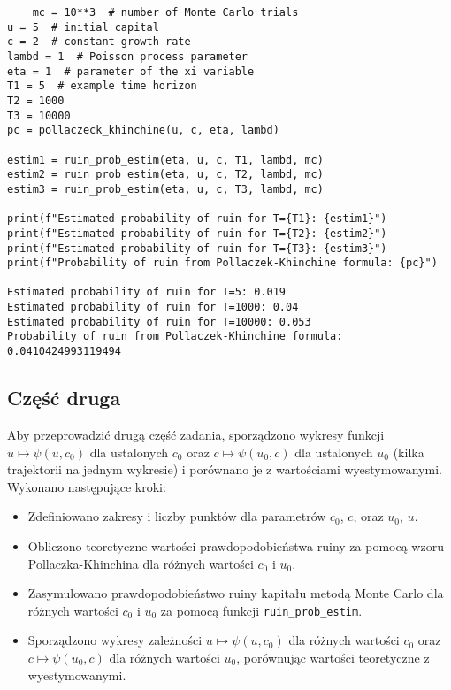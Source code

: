 \documentclass[12pt,letterpaper]{article}
\theoremstyle{definition}
\begin{document}
\begin{lstlisting}
    mc = 10**3  # number of Monte Carlo trials
u = 5  # initial capital
c = 2  # constant growth rate
lambd = 1  # Poisson process parameter
eta = 1  # parameter of the xi variable
T1 = 5  # example time horizon
T2 = 1000
T3 = 10000
pc = pollaczeck_khinchine(u, c, eta, lambd)

estim1 = ruin_prob_estim(eta, u, c, T1, lambd, mc)
estim2 = ruin_prob_estim(eta, u, c, T2, lambd, mc)
estim3 = ruin_prob_estim(eta, u, c, T3, lambd, mc)

print(f"Estimated probability of ruin for T={T1}: {estim1}")
print(f"Estimated probability of ruin for T={T2}: {estim2}")
print(f"Estimated probability of ruin for T={T3}: {estim3}")
print(f"Probability of ruin from Pollaczek-Khinchine formula: {pc}")

Estimated probability of ruin for T=5: 0.019
Estimated probability of ruin for T=1000: 0.04
Estimated probability of ruin for T=10000: 0.053
Probability of ruin from Pollaczek-Khinchine formula: 0.0410424993119494

\end{lstlisting}

\subsection{Część druga}
Aby przeprowadzić drugą część zadania, sporządzono wykresy funkcji \( u \mapsto \psi(u, c_0) \) dla ustalonych \( c_0 \) oraz \( c \mapsto \psi(u_0, c) \) dla ustalonych \( u_0 \) (kilka trajektorii na jednym wykresie) i porównano je z wartościami wyestymowanymi. Wykonano następujące kroki:
\begin{itemize}
    \item Zdefiniowano zakresy i liczby punktów dla parametrów \( c_0 \), \( c \), oraz \( u_0 \), \( u \).
    \item Obliczono teoretyczne wartości prawdopodobieństwa ruiny za pomocą wzoru Pollaczka-Khinchina dla różnych wartości \( c_0 \) i \( u_0 \).
    \item Zasymulowano prawdopodobieństwo ruiny kapitału metodą Monte Carlo dla różnych wartości \( c_0 \) i \( u_0 \) za pomocą funkcji \texttt{ruin\_prob\_estim}.
    \item Sporządzono wykresy zależności \( u \mapsto \psi(u, c_0) \) dla różnych wartości \( c_0 \) oraz \( c \mapsto \psi(u_0, c) \) dla różnych wartości \( u_0 \), porównując wartości teoretyczne z wyestymowanymi.
\end{itemize}
\end{document}
